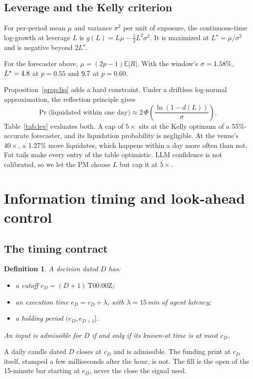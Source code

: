 \documentclass[11pt]{article}
\newtheorem{definition}{Definition}
\theoremstyle{remark}
\newcommand{\E}{\mathbb{E}}
\begin{document}
\subsection{Leverage and the Kelly criterion}
For per-period mean $\mu$ and variance $\sigma^2$ per unit of exposure, the continuous-time log-growth at leverage $L$ is $g(L)=L\mu-\tfrac12L^2\sigma^2$. It is maximized at $L^\star=\mu/\sigma^2$ \citep{kelly1956new} and is negative beyond $2L^\star$.

For the forecaster above, $\mu=(2p-1)\E|R|$. With the window's $\sigma=1.58\%$, $L^\star=4.8$ at $p=0.55$ and $9.7$ at $p=0.60$.

Proposition~\ref{prop:liq} adds a hard constraint. Under a driftless log-normal approximation, the reflection principle gives
\[
\Pr\big(\text{liquidated within one day}\big) \approx 2\,\Phi\!\left(\frac{\ln(1-d(L))}{\sigma}\right).
\]
Table~\ref{tab:lev} evaluates both. A cap of $5\times$ sits at the Kelly optimum of a 55\%-accurate forecaster, and its liquidation probability is negligible. At the venue's $40\times$, a 1.27\% move liquidates, which happens within a day more often than not. Fat tails make every entry of the table optimistic. LLM confidence is not calibrated, so we let the PM choose $L$ but cap it at $5\times$.

\begin{table}[t]\centering\small
\caption{Leverage on BTC-PERP at the window's daily volatility. Liquidation distance from Proposition~\ref{prop:liq} (long, $m=1.25\%$). Liquidation probabilities use the reflection principle on a driftless log-normal; heavier tails would raise them. Growth is the annualized log-growth $g(L)$ of a forecaster with 55\% accuracy, gross of costs.}\label{tab:lev}

\end{table}

\section{Information timing and look-ahead control}\label{sec:leakage}

\subsection{The timing contract}
\begin{definition}
A decision dated $D$ has:
\begin{itemize}
\item a cutoff $c_D=(D+1)\,\text{T00:00Z}$;
\item an execution time $e_D=c_D+\lambda$, with $\lambda=15$\,min of agent latency;
\item a holding period $(e_D,e_{D+1}]$.
\end{itemize}
An input is admissible for $D$ if and only if its \emph{known-at} time is at most $c_D$.
\end{definition}
A daily candle dated $D$ closes at $c_D$ and is admissible. The funding print at $c_D$ itself, stamped a few milliseconds after the hour, is not. The fill is the open of the 15-minute bar starting at $e_D$, never the close the signal used.
\end{document}
